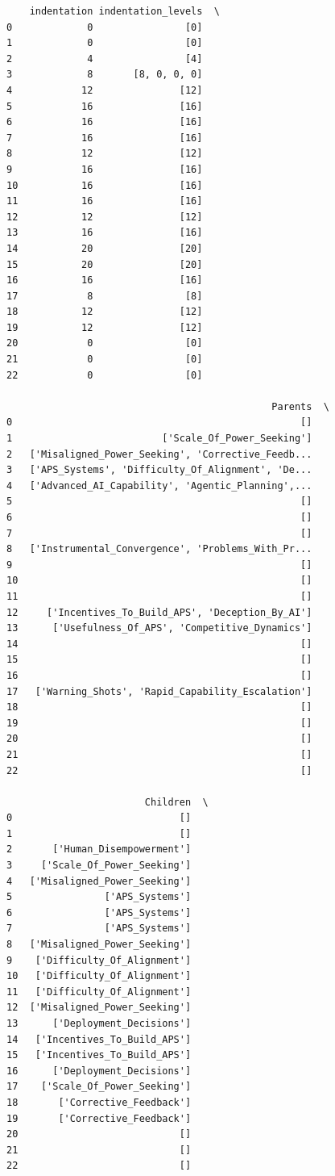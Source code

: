 \documentclass[
  11pt,
  letterpaper,
]{book}
\begin{document}
\begin{verbatim}
    indentation indentation_levels  \
0             0                [0]   
1             0                [0]   
2             4                [4]   
3             8       [8, 0, 0, 0]   
4            12               [12]   
5            16               [16]   
6            16               [16]   
7            16               [16]   
8            12               [12]   
9            16               [16]   
10           16               [16]   
11           16               [16]   
12           12               [12]   
13           16               [16]   
14           20               [20]   
15           20               [20]   
16           16               [16]   
17            8                [8]   
18           12               [12]   
19           12               [12]   
20            0                [0]   
21            0                [0]   
22            0                [0]   

                                              Parents  \
0                                                  []   
1                          ['Scale_Of_Power_Seeking']   
2   ['Misaligned_Power_Seeking', 'Corrective_Feedb...   
3   ['APS_Systems', 'Difficulty_Of_Alignment', 'De...   
4   ['Advanced_AI_Capability', 'Agentic_Planning',...   
5                                                  []   
6                                                  []   
7                                                  []   
8   ['Instrumental_Convergence', 'Problems_With_Pr...   
9                                                  []   
10                                                 []   
11                                                 []   
12     ['Incentives_To_Build_APS', 'Deception_By_AI']   
13      ['Usefulness_Of_APS', 'Competitive_Dynamics']   
14                                                 []   
15                                                 []   
16                                                 []   
17   ['Warning_Shots', 'Rapid_Capability_Escalation']   
18                                                 []   
19                                                 []   
20                                                 []   
21                                                 []   
22                                                 []   

                        Children  \
0                             []   
1                             []   
2       ['Human_Disempowerment']   
3     ['Scale_Of_Power_Seeking']   
4   ['Misaligned_Power_Seeking']   
5                ['APS_Systems']   
6                ['APS_Systems']   
7                ['APS_Systems']   
8   ['Misaligned_Power_Seeking']   
9    ['Difficulty_Of_Alignment']   
10   ['Difficulty_Of_Alignment']   
11   ['Difficulty_Of_Alignment']   
12  ['Misaligned_Power_Seeking']   
13      ['Deployment_Decisions']   
14   ['Incentives_To_Build_APS']   
15   ['Incentives_To_Build_APS']   
16      ['Deployment_Decisions']   
17    ['Scale_Of_Power_Seeking']   
18       ['Corrective_Feedback']   
19       ['Corrective_Feedback']   
20                            []   
21                            []   
22                            []   


\end{verbatim}
\end{document}
